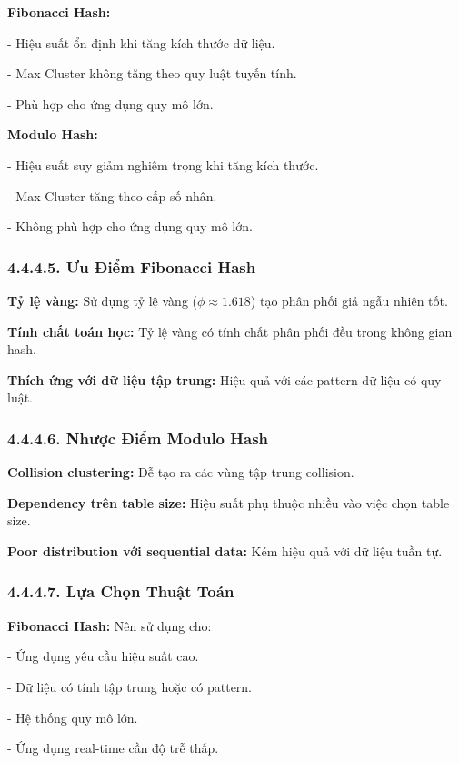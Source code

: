 \documentclass[12pt,a4paper]{report}
\begin{document}
\noindent \indent \textbf{Fibonacci Hash:}

    - Hiệu suất ổn định khi tăng kích thước dữ liệu.
    
    - Max Cluster không tăng theo quy luật tuyến tính.
    
    - Phù hợp cho ứng dụng quy mô lớn.

\textbf{Modulo Hash:}

    - Hiệu suất suy giảm nghiêm trọng khi tăng kích thước.
    
    - Max Cluster tăng theo cấp số nhân.
    
    - Không phù hợp cho ứng dụng quy mô lớn.

\subsubsection*{4.4.4.5. Ưu Điểm Fibonacci Hash}
    \noindent \indent \textbf{Tỷ lệ vàng:} Sử dụng tỷ lệ vàng ($\phi \approx 1.618$) tạo phân phối giả ngẫu nhiên tốt.
    
    \textbf{Tính chất toán học:} Tỷ lệ vàng có tính chất phân phối đều trong không gian hash.
    
     \textbf{Thích ứng với dữ liệu tập trung:} Hiệu quả với các pattern dữ liệu có quy luật.

\subsubsection*{4.4.4.6. Nhược Điểm Modulo Hash}
    \noindent \indent \textbf{Collision clustering:} Dễ tạo ra các vùng tập trung collision.
    
     \textbf{Dependency trên table size:} Hiệu suất phụ thuộc nhiều vào việc chọn table size.
     
     \textbf{Poor distribution với sequential data:} Kém hiệu quả với dữ liệu tuần tự.

\subsubsection*{4.4.4.7. Lựa Chọn Thuật Toán}

\noindent \indent \textbf{Fibonacci Hash:} Nên sử dụng cho:

    - Ứng dụng yêu cầu hiệu suất cao.
    
    - Dữ liệu có tính tập trung hoặc có pattern.
    
    - Hệ thống quy mô lớn.
    
    - Ứng dụng real-time cần độ trễ thấp.
\end{document}
